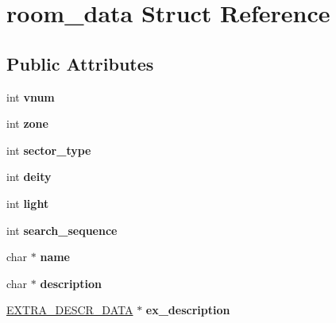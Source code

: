 \hypertarget{structroom__data}{\section{room\-\_\-data Struct Reference}
\label{structroom__data}
}
\subsection*{Public Attributes}
\begin{DoxyCompactItemize}
\item 
\hypertarget{structroom__data_a1da0540f0aa7691a1f0083cfa2c5503e}{int {\bfseries vnum}}\label{structroom__data_a1da0540f0aa7691a1f0083cfa2c5503e}

\item 
\hypertarget{structroom__data_a383dffb948db697aa64c2dbcfe3872a9}{int {\bfseries zone}}\label{structroom__data_a383dffb948db697aa64c2dbcfe3872a9}

\item 
\hypertarget{structroom__data_adcba259049bfe3580ddba8f5ec8f14aa}{int {\bfseries sector\-\_\-type}}\label{structroom__data_adcba259049bfe3580ddba8f5ec8f14aa}

\item 
\hypertarget{structroom__data_a84dd99267244c69b0008fd5288ba36a4}{int {\bfseries deity}}\label{structroom__data_a84dd99267244c69b0008fd5288ba36a4}

\item 
\hypertarget{structroom__data_a648c8cb52e1ec2627819c9693f1bb841}{int {\bfseries light}}\label{structroom__data_a648c8cb52e1ec2627819c9693f1bb841}

\item 
\hypertarget{structroom__data_aecb36bedf2a3d19b76182ae6f53ed707}{int {\bfseries search\-\_\-sequence}}\label{structroom__data_aecb36bedf2a3d19b76182ae6f53ed707}

\item 
\hypertarget{structroom__data_a6e34bceb6379469470f8d136b6b9fd2e}{char $\ast$ {\bfseries name}}\label{structroom__data_a6e34bceb6379469470f8d136b6b9fd2e}

\item 
\hypertarget{structroom__data_a6e3a9b1bac21549b5f2e8dad993a39db}{char $\ast$ {\bfseries description}}\label{structroom__data_a6e3a9b1bac21549b5f2e8dad993a39db}

\item 
\hypertarget{structroom__data_a2b1f9a94eb87c1aed90ae71c1230f505}{\hyperlink{structextra__descr__data}{E\-X\-T\-R\-A\-\_\-\-D\-E\-S\-C\-R\-\_\-\-D\-A\-T\-A} $\ast$ {\bfseries ex\-\_\-description}}\label{structroom__data_a2b1f9a94eb87c1aed90ae71c1230f505}


\end{DoxyCompactItemize}
